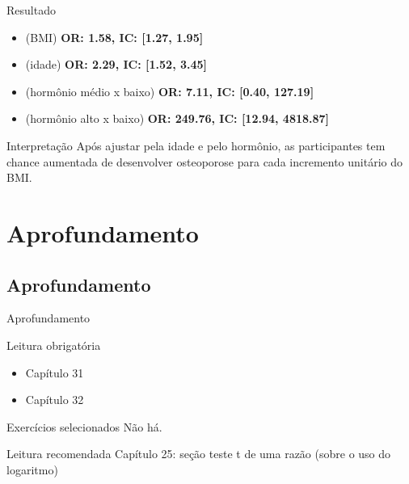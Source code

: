 \documentclass{beamer}
\begin{document}
\begin{frame}
  \begin{block}{Resultado}
    \begin{itemize}
    \item {\small (BMI)} {\bf OR: 1.58, IC: [1.27, 1.95]}
    \item {\small (idade)} {\bf OR: 2.29, IC: [1.52, 3.45]}
    \item {\small (hormônio médio x baixo)} {\bf OR: 7.11, IC: [0.40, 127.19]}
    \item {\small (hormônio alto x baixo)} {\bf OR: 249.76, IC: [12.94, 4818.87]}
    \end{itemize}
  \end{block}
    \begin{block}{Interpretação}
    Após ajustar pela idade e pelo hormônio, as participantes tem chance aumentada de desenvolver osteoporose para cada incremento unitário do BMI.
  \end{block}
\end{frame}

\section{Aprofundamento}

\subsection{Aprofundamento}

\begin{frame}{Aprofundamento}
  \begin{block}{Leitura obrigatória}
    \begin{itemize}
      \footnotesize
    \item Capítulo 31
    \item Capítulo 32
    \end{itemize}
  \end{block}
  \begin{block}{Exercícios selecionados}
    \footnotesize
    Não há.
  \end{block}
  \begin{block}{Leitura recomendada}
    \footnotesize
    Capítulo 25: seção teste t de uma razão (sobre o uso do logaritmo)


  \end{block}
\end{frame}
\end{document}
